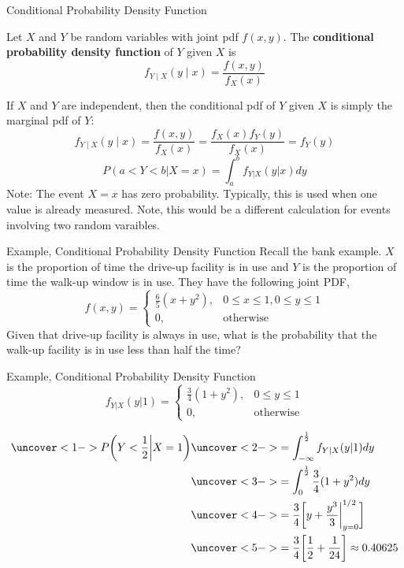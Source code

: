 \documentclass[t,handout]{beamer}
\begin{document}
\begin{frame}{Conditional Probability Density Function}
\begin{block}{}
Let $X$ and $Y$ be random variables with joint pdf $f(x,y)$. The \textbf{conditional probability density function} of $Y$ given $X$ is
$$f_{Y\mid X}(y\mid x) = \frac{f(x,y)}{f_X(x)}$$
\end{block}
\pause If $X$ and $Y$ are independent, then the conditional pdf of $Y$ given $X$ is simply the marginal pdf of $Y$:
$$f_{Y\mid X}(y\mid x) = \frac{f(x,y)}{f_X(x)} = \frac{f_X(x)f_Y(y)}{f_X(x)} = f_Y(y)$$
$$ P(a<Y<b|X=x) = \int_{a}^b f_{Y|X}(y|x)dy $$
\pause Note: The event $X=x$ has zero probability. Typically, this is used when one value is already measured. Note, this would be a different calculation for events involving two random varaibles.
\end{frame}

\begin{frame}{Example, Conditional Probability Density Function}
    Recall the bank example. $X$ is the proportion of time the drive-up facility is in use and $Y$ is the proportion of time the walk-up window is in use. They have the following joint PDF,
$$f(x,y)=\begin{cases}\frac65(x+y^2), & 0\leq x \leq 1, 0\leq y\leq 1 \\ 0, & \text{otherwise}\end{cases}$$
    Given that drive-up facility is always in use, what is the probability that the walk-up facility is in use less than half the time?\\
    \vfill
\end{frame}

\begin{frame}{Example, Conditional Probability Density Function}
$$f_{Y|X}(y|1)=\begin{cases}
    \frac{3}{4} (1+y^2), & 0\leq y\leq 1 \\ 
0, & \text{otherwise}\end{cases}$$

\begin{align*}
    \uncover<1->{P\bigg(Y<\frac{1}{2}\bigg|X=1\bigg) } & \uncover<2->{=\int^{\frac{1}{2}}_{-\infty} f_{Y|X}(y|1) dy} \\
    & \uncover<3->{=\int^{\frac{1}{2}}_0 \frac{3}{4} (1+y^2) dy} \\
    & \uncover<4->{= \frac{3}{4} \bigg[ y+\frac{y^3}{3} \bigg|_{y=0}^{1/2} \bigg]} \\
    & \uncover<5->{= \frac{3}{4} \bigg[ \frac{1}{2}+\frac{1}{24} \bigg] \approx 0.40625} \\
\end{align*}
    \vfill
\end{frame}
\end{document}
